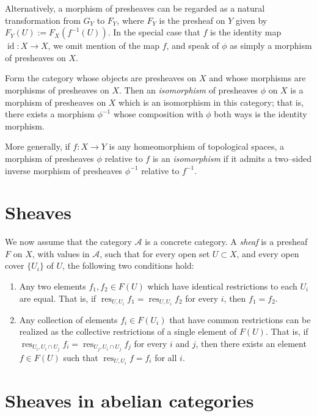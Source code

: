 \documentclass[12pt]{article}
\newcommand{\A}{\mathcal{A}}
\newcommand{\res}{\operatorname{res}}
\newcommand{\id}{\operatorname{id}}
\begin{document}
Alternatively, a morphism of presheaves can be regarded as a natural
transformation from $G_Y$ to $F_Y$, where $F_Y$ is the presheaf on $Y$
given by $F_Y(U) := F_X(f^{-1}(U))$.  In the special case that $f$ is the
identity map $\id\colon X \to X$, we omit mention of the map $f$, and speak of
$\phi$ as simply a morphism of presheaves on $X$.

Form the category whose objects are presheaves
on $X$ and whose morphisms are morphisms of presheaves on $X$. Then an
\emph{isomorphism} of presheaves $\phi$ on $X$ is a morphism of
presheaves on $X$ which is an isomorphism in this category; that is,
there exists a morphism $\phi^{-1}$ whose composition with $\phi$ both
ways is the identity morphism.

More generally, if $f\colon X \to Y$ is any homeomorphism of topological
spaces, a morphism of presheaves $\phi$ relative to $f$ is an \emph{isomorphism} if it admits a two--sided inverse morphism of presheaves
$\phi^{-1}$ relative to $f^{-1}$.

\section{Sheaves}

We now assume that the category $\A$ is a concrete category. A \emph{sheaf} is a presheaf $F$ on $X$, with values in $\A$, such that for
every open set $U \subset X$, and every open cover $\{U_i\}$ of
$U$, the following two conditions hold:
\begin{enumerate}
\item Any two elements $f_1, f_2 \in F(U)$ which have identical
restrictions to each $U_i$ are equal. That is, if $\res_{U,U_i} f_1 =
\res_{U,U_i} f_2$ for every $i$, then $f_1 = f_2$.
\item Any collection of elements $f_i \in F(U_i)$ that have common
restrictions can be realized as the collective restrictions of a
single element of $F(U)$. That is, if $\res_{U_i, U_i \cap U_j} f_i =
\res_{U_j, U_i \cap U_j} f_j$ for every $i$ and $j$, then there exists
an element $f \in F(U)$ such that $\res_{U,U_i} f = f_i$ for all $i$.
\end{enumerate}

\section{Sheaves in abelian categories}
\end{document}
